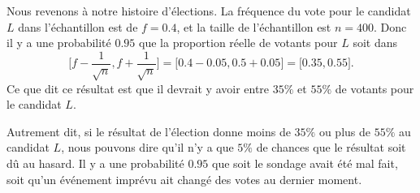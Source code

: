 Nous revenons à notre histoire d'élections. La fréquence du vote pour le candidat \( L\) dans l'échantillon est de \( f=0.4\), et la taille de l'échantillon est \( n=400\). Donc il y a une probabilité \( 0.95\) que la proportion réelle de votants pour \( L\) soit dans
\begin{equation}
    \mathopen[ f-\frac{1}{ \sqrt{n} } , f+\frac{1}{ \sqrt{n} } \mathclose]=\mathopen[ 0.4-0.05 , 0.5+0.05 \mathclose]=\mathopen[ 0.35 , 0.55 \mathclose].
\end{equation}
Ce que dit ce résultat est que il devrait y avoir entre \( 35\%\) et \( 55\%\) de votants pour le candidat \( L\).

Autrement dit, si le résultat de l'élection donne moins de \( 35\%\) ou plus de \( 55\%\) au candidat \( L\), nous pouvons dire qu'il n'y a que \( 5\%\) de chances que le résultat soit dû au hasard. Il y a une probabilité \( 0.95\) que soit le sondage avait été mal fait, soit qu'un événement imprévu ait changé des votes au dernier moment.

